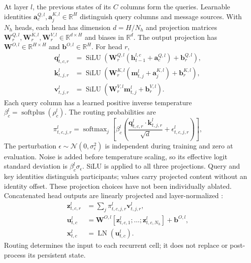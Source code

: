 \documentclass[letterpaper,twoside]{article}
\begin{document}
At layer $l$, the previous states of its $C$ columns form the queries. Learnable identities $\mathbf{a}_c^{Q,l},\mathbf{a}_j^{K,l}\in\mathbb{R}^{H}$ distinguish query columns and message sources. With $N_h$ heads, each head has dimension $d=H/N_h$ and projection matrices $\mathbf{W}_r^{Q,l},\mathbf{W}_r^{K,l},\mathbf{W}_r^{V,l}\in\mathbb{R}^{d\times H}$ and biases in $\mathbb{R}^{d}$. The output projection has $\mathbf{W}^{O,l}\in\mathbb{R}^{H\times H}$ and $\mathbf{b}^{O,l}\in\mathbb{R}^{H}$. For head $r$,
\begin{align}
\mathbf{q}_{t,c,r}^l &=
    \operatorname{SiLU}\!\left(
    \mathbf{W}_r^{Q,l}(\mathbf{h}_{t-1}^{l,c}+\mathbf{a}_c^{Q,l})+\mathbf{b}_r^{Q,l}
    \right), \\
\mathbf{k}_{t,j,r}^l &=
    \operatorname{SiLU}\!\left(
    \mathbf{W}_r^{K,l}(\mathbf{m}_{t,j}^l+\mathbf{a}_j^{K,l})+\mathbf{b}_r^{K,l}
    \right), \\
\mathbf{v}_{t,j,r}^l &=
    \operatorname{SiLU}\!\left(
    \mathbf{W}_r^{V,l}\mathbf{m}_{t,j}^l+\mathbf{b}_r^{V,l}
    \right).
\end{align}
Each query column has a learned positive inverse temperature $\beta_c^l=\operatorname{softplus}(\rho_c^l)$. The routing probabilities are
\begin{equation}
\pi_{t,c,j,r}^l =
\operatorname{softmax}_j\!\left[
\beta_c^l\left(
\frac{\mathbf{q}_{t,c,r}^l \cdot \mathbf{k}_{t,j,r}^l}{\sqrt{d}}
+ \epsilon_{t,c,j,r}^l
\right)\right],
\end{equation}
The perturbation $\epsilon\sim\mathcal{N}(0,\sigma_\epsilon^2)$ is independent during training and zero at evaluation. Noise is added before temperature scaling, so its effective logit standard deviation is $\beta_c^l\sigma_\epsilon$. SiLU \citep{elfwing2018silu} is applied to all three projections. Query and key identities distinguish participants; values carry projected content without an identity offset. These projection choices have not been individually ablated. Concatenated head outputs are linearly projected and layer-normalized \citep{ba2016layernorm}:
\begin{equation}
\begin{aligned}
\mathbf{z}_{t,c,r}^l
    &= \sum_j \pi_{t,c,j,r}^l\mathbf{v}_{t,j,r}^l,\\
\mathbf{u}_{t,c}^l
    &= \mathbf{W}^{O,l}[\mathbf{z}_{t,c,1}^l;\ldots;\mathbf{z}_{t,c,N_h}^l]
       +\mathbf{b}^{O,l},\\
\mathbf{x}_{t,c}^l
    &= \operatorname{LN}(\mathbf{u}_{t,c}^l).
\end{aligned}
\end{equation}
Routing determines the input to each recurrent cell; it does not replace or post-process its persistent state.
\end{document}
